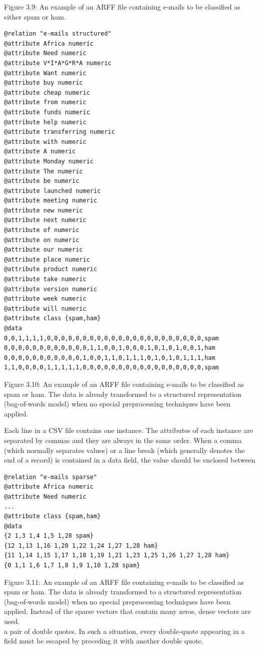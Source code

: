 \documentclass[10pt]{book}
\begin{document}
Figure 3.9: An example of an ARFF file containing e-mails to be classified as either spam or ham.

\begin{verbatim}
@relation "e-mails structured"
@attribute Africa numeric
@attribute Need numeric
@attribute V*I*A*G*R*A numeric
@attribute Want numeric
@attribute buy numeric
@attribute cheap numeric
@attribute from numeric
@attribute funds numeric
@attribute help numeric
@attribute transferring numeric
@attribute with numeric
@attribute A numeric
@attribute Monday numeric
@attribute The numeric
@attribute be numeric
@attribute launched numeric
@attribute meeting numeric
@attribute new numeric
@attribute next numeric
@attribute of numeric
@attribute on numeric
@attribute our numeric
@attribute place numeric
@attribute product numeric
@attribute take numeric
@attribute version numeric
@attribute week numeric
@attribute will numeric
@attribute class {spam,ham}
@data
0,0,1,1,1,1,0,0,0,0,0,0,0,0,0,0,0,0,0,0,0,0,0,0,0,0,0,0,spam
0,0,0,0,0,0,0,0,0,0,0,0,1,1,0,0,1,0,0,0,1,0,1,0,1,0,0,1,ham
0,0,0,0,0,0,0,0,0,0,0,1,0,0,1,1,0,1,1,1,0,1,0,1,0,1,1,1,ham
1,1,0,0,0,0,1,1,1,1,1,0,0,0,0,0,0,0,0,0,0,0,0,0,0,0,0,0,spam
\end{verbatim}

Figure 3.10: An example of an ARFF file containing e-mails to be classified as spam or ham. The data is already transformed to a structured representation (bag-of-words model) when no special preprocessing techniques have been applied.

Each line in a CSV file contains one instance. The attributes of each instance are separated by commas and they are always in the same order. When a comma (which normally separates values) or a line break (which generally denotes the end of a record) is contained in a data field, the value should be enclosed between

\begin{verbatim}
@relation "e-mails sparse"
@attribute Africa numeric
@attribute Need numeric
...
@attribute class {spam,ham}
@data
{2 1,3 1,4 1,5 1,28 spam}
{12 1,13 1,16 1,20 1,22 1,24 1,27 1,28 ham}
{11 1,14 1,15 1,17 1,18 1,19 1,21 1,23 1,25 1,26 1,27 1,28 ham}
{0 1,1 1,6 1,7 1,8 1,9 1,10 1,28 spam}
\end{verbatim}

Figure 3.11: An example of an ARFF file containing e-mails to be classified as spam or ham. The data is already transformed to a structured representation (bag-of-words model) when no special preprocessing techniques have been applied. Instead of the sparse vectors that contain many zeros, dense vectors are used.\\
a pair of double quotes. In such a situation, every double-quote appearing in a field must be escaped by preceding it with another double quote.
\end{document}

